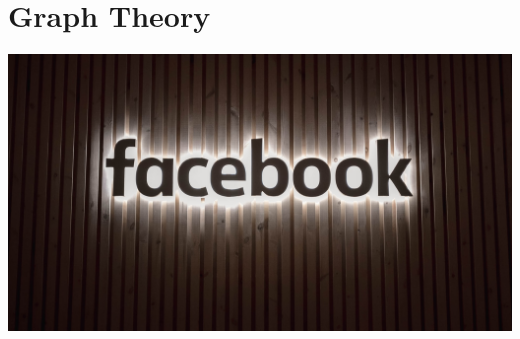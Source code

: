 \documentclass[9pt,letter,twoside,openright]{memoir}
\begin{document}

\chapter{Graph Theory}
\begin{center}\includegraphics[width=\textwidth]{facebook1}\end{center}
\end{document}
